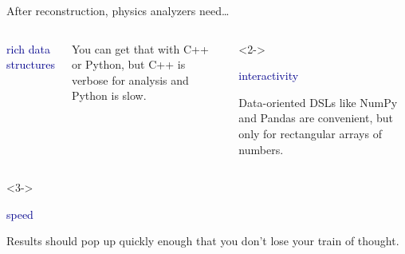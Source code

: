 \documentclass[aspectratio=169]{beamer}
\begin{document}

\begin{frame}{After reconstruction, physics analyzers need\ldots}
\Large
\vspace{-0.5 cm}

\begin{columns}[t]
\begin{center}
\textcolor{darkblue}{\LARGE rich data structures}
\end{center}

\vspace{-0.2 cm}
You can get that with C++ or Python, but C++ is verbose for analysis and Python is slow.

\begin{uncoverenv}<2->
\begin{center}
\textcolor{darkblue}{\LARGE interactivity}
\end{center}

\vspace{-0.2 cm}
Data-oriented DSLs like NumPy and Pandas are convenient, but only for rectangular arrays of numbers.
\end{uncoverenv}
\end{columns}

\vspace{0.25 cm}
\begin{columns}
\begin{uncoverenv}<3->
\begin{center}
\textcolor{darkblue}{\LARGE speed}
\end{center}

\vspace{-0.2 cm}
Results should pop up quickly enough that you don't lose your train of thought.
\end{uncoverenv}
\end{columns}
\end{frame}
\end{document}
